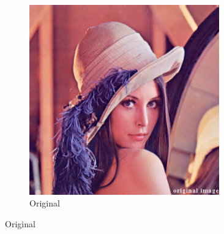 \begin{figure}[H]
	\centering
	\begin{subfigure}[t]{0.5\textwidth}
		\centering
		\includegraphics[width=0.9\textwidth]{lena}
		\caption{Original}
	\end{subfigure}%


\end{figure}
